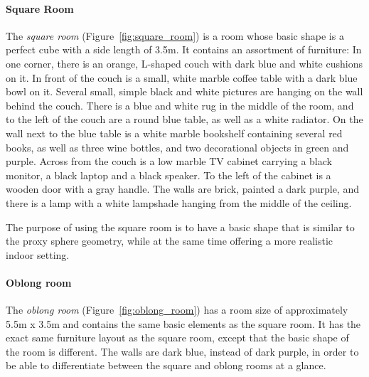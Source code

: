\paragraph{Square Room}
The \emph{square room} (Figure~\ref{fig:square_room}) is a room whose basic shape is a perfect cube with a side length of 3.5m. It contains an assortment of furniture\footnotemark: In one corner, there is an orange, L-shaped couch with dark blue and white cushions on it. In front of the couch is a small, white marble coffee table with a dark blue bowl on it. Several small, simple black and white pictures are hanging on the wall behind the couch. There is a blue and white rug in the middle of the room, and to the left of the couch are a round blue table, as well as a white radiator. On the wall next to the blue table is a white marble bookshelf containing several red books, as well as three wine bottles, and two decorational objects in green and purple. Across from the couch is a low marble TV cabinet carrying a black monitor, a black laptop and a black speaker. To the left of the cabinet is a wooden door with a gray handle. The walls are brick, painted a dark purple, and there is a lamp with a white lampshade hanging from the middle of the ceiling.

The purpose of using the square room is to have a basic shape that is similar to the proxy sphere geometry, while at the same time offering a more realistic indoor setting.

\paragraph{Oblong room}
The \emph{oblong room} (Figure~\ref{fig:oblong_room}) has a room size of approximately 5.5m x 3.5m and contains the same basic elements as the square room. It has the exact same furniture layout as the square room, except that the basic shape of the room is different. The walls are dark blue, instead of dark purple, in order to be able to differentiate between the square and oblong rooms at a glance.

